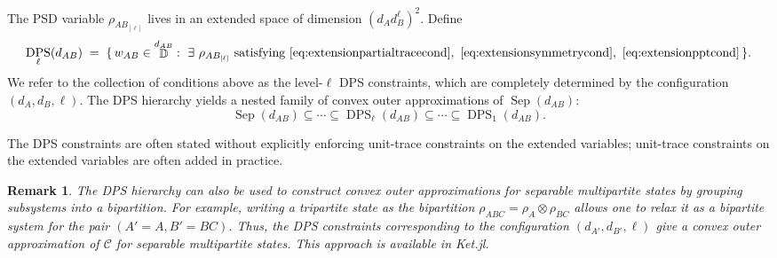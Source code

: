 \documentclass[smallextended]{svjour3}
\newtheorem{remark}{Remark}
\newcommand{\cC}{\mathcal C}
\DeclareMathOperator{\sep}{Sep}
\DeclareMathOperator{\dmat}{\mathbb{D}}
\newcommand{\1}{\mathbf{1}}
\DeclareMathOperator{\dps}{DPS}
\begin{document}
The PSD variable $\rho_{AB_{[\ell]}}$ lives in an extended space of dimension $(d_A d^\ell_B)^2$. Define
\begin{equation}
 \dps_\ell(d_{AB}) \;=\; \{\,w_{AB} \in \dmat^{d_{AB}}:\ \exists\ \rho_{AB_{[\ell]}}\ \text{satisfying } \eqref{eq:extensionpartialtracecond},\ \eqref{eq:extensionsymmetrycond},\ \eqref{eq:extensionpptcond}\,\}.
\end{equation}
We refer to the collection of conditions above as the level-$\ell$ DPS constraints, which are completely determined by the configuration $(d_A,d_B, \ell)$. The DPS hierarchy yields a nested family of convex outer approximations of $\sep(d_{AB})$:
\begin{equation}
    \sep(d_{AB}) \subseteq \cdots \subseteq \dps_\ell(d_{AB})  \subseteq  \cdots   \subseteq \dps_1(d_{AB}).
\end{equation}

The DPS constraints are often stated without explicitly enforcing unit-trace constraints on the extended variables;  unit-trace constraints on the extended variables are often added in practice.

\begin{remark}
    \label{rmk.dps}
 The DPS hierarchy can also be used to construct convex outer approximations for separable multipartite states by grouping subsystems into a bipartition. For example, writing a tripartite state as the bipartition $\rho_{ABC}=\rho_A\otimes\rho_{BC}$ allows one to relax it as a bipartite system for the pair $(A'=A,B'=BC)$.  Thus, the DPS constraints corresponding to the configuration $(d_{A'},d_{B'}, \ell)$  give a convex outer approximation of $\cC$ for separable multipartite states. This approach is available in Ket.jl.
\end{remark}
\end{document}
